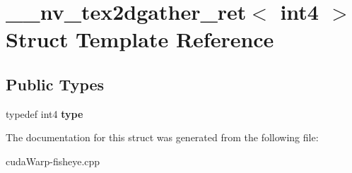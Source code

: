 \hypertarget{struct____nv__tex2dgather__ret_3_01int4_01_4}{}\section{\+\_\+\+\_\+nv\+\_\+tex2dgather\+\_\+ret$<$ int4 $>$ Struct Template Reference}
\label{struct____nv__tex2dgather__ret_3_01int4_01_4}
\subsection*{Public Types}
\begin{DoxyCompactItemize}
\item 
typedef int4 {\bfseries type}\hypertarget{struct____nv__tex2dgather__ret_3_01int4_01_4_ae89c93120dee6c374f95abdff9c7bea3}{}\label{struct____nv__tex2dgather__ret_3_01int4_01_4_ae89c93120dee6c374f95abdff9c7bea3}

\end{DoxyCompactItemize}


The documentation for this struct was generated from the following file\+:\begin{DoxyCompactItemize}
\item 
cuda\+Warp-\/fisheye.\+cpp\end{DoxyCompactItemize}
